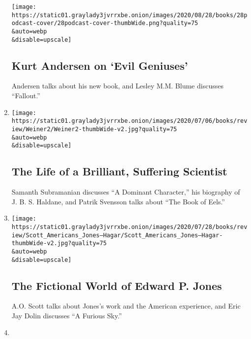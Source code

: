 \begin{enumerate}
  \texttt{[image: https://static01.graylady3jvrrxbe.onion/images/2020/08/28/books/28podcast-cover/28podcast-cover-thumbWide.png?quality=75\\\&auto=webp\\\&disable=upscale]}

  \hypertarget{kurt-andersen-on-evil-geniuses}{%
  \subsection{Kurt Andersen on `Evil
  Geniuses'}\label{kurt-andersen-on-evil-geniuses}}

  Andersen talks about his new book, and Lesley M.M. Blume discusses
  ``Fallout.''
\item
  \href{/2020/08/21/books/review/podcast-Dominant-Character-Samanth-Subramanian-Book-of-Eels-Patrik-Svensson.html}{}

  \texttt{[image: https://static01.graylady3jvrrxbe.onion/images/2020/07/06/books/review/Weiner2/Weiner2-thumbWide-v2.jpg?quality=75\\\&auto=webp\\\&disable=upscale]}

  \hypertarget{the-life-of-a-brilliant-suffering-scientist}{%
  \subsection{The Life of a Brilliant, Suffering
  Scientist}\label{the-life-of-a-brilliant-suffering-scientist}}

  Samanth Subramanian discusses ``A Dominant Character,'' his biography
  of J. B. S. Haldane, and Patrik Svensson talks about ``The Book of
  Eels.''
\item
  \href{/2020/08/14/books/review/podcast-a-o-scott-edward-p-jones-eric-jay-dolin-furious-sky-hurricanes.html}{}

  \texttt{[image: https://static01.graylady3jvrrxbe.onion/images/2020/07/28/books/review/Scott\_Americans\_Jones--Hagar/Scott\_Americans\_Jones--Hagar-thumbWide-v2.jpg?quality=75\\\&auto=webp\\\&disable=upscale]}

  \hypertarget{the-fictional-world-of-edward-p-jones}{%
  \subsection{The Fictional World of Edward P.
  Jones}\label{the-fictional-world-of-edward-p-jones}}

  A.O. Scott talks about Jones's work and the American experience, and
  Eric Jay Dolin discusses ``A Furious Sky.''
\item
  \href{/2020/08/07/books/review/podcast-isabel-wilkerson-caste-david-hill-vapors.html}{}


\end{enumerate}
